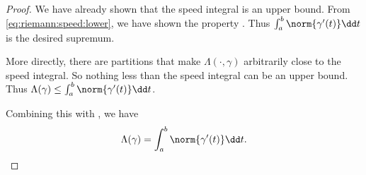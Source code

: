 \begin{proof}
    We have already shown that the speed integral is an upper bound.
    From \cref{eq:riemann:speed:lower}, we have shown the
    property .
    Thus $\int_a^b \norm{\gamma'(t)} \dd t$ is the desired supremum.

    More directly, there are partitions that make $\Lambda(\cdot, \gamma)$
    arbitrarily close to the speed integral.
    So nothing less than the speed integral can be an upper bound.
    Thus $\Lambda(\gamma) \le \int_a^b \norm{\gamma'(t)} \dd t$.

    Combining this with , we have \[
        \Lambda(\gamma) = \int_a^b \norm{\gamma'(t)} \dd t. \qedhere
    \]
\end{proof}

